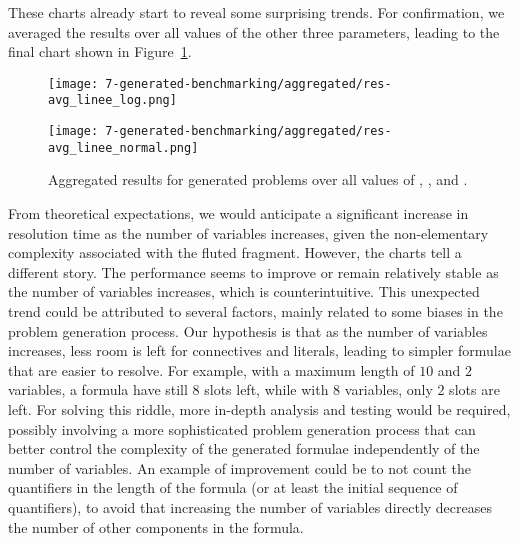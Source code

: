 These charts already start to reveal some surprising trends. For confirmation, we averaged the results over all values of the other three parameters, leading to the final chart shown in Figure~\ref{fig:agg-all-vars}.
\begin{figure}[H]
  \centering
  \begin{minipage}{1\textwidth}
    \centering
    \texttt{[image: 7-generated-benchmarking/aggregated/res-avg\_linee\_log.png]}
  \end{minipage}
  \hfill
  \begin{minipage}{1\textwidth}
    \centering
    \texttt{[image: 7-generated-benchmarking/aggregated/res-avg\_linee\_normal.png]}
  \end{minipage}
  \caption{Aggregated results for generated problems over all values of , , and .}\label{fig:agg-all-vars}
\end{figure}
From theoretical expectations, we would anticipate a significant increase in resolution time as the number of variables increases, given the non-elementary complexity associated with the fluted fragment.
However, the charts tell a different story. The performance seems to improve or remain relatively stable as the number of variables increases, which is counterintuitive.
This unexpected trend could be attributed to several factors, mainly related to some biases in the problem generation process.
Our hypothesis is that as the number of variables increases, less room is left for connectives and literals, leading to simpler formulae that are easier to resolve.
For example, with a maximum length of \(10\) and \(2\) variables, a formula have still \(8\) slots left, while with \(8\) variables, only \(2\) slots are left.
For solving this riddle, more in-depth analysis and testing would be required, possibly involving a more sophisticated problem generation process that can better control the complexity of the generated formulae independently of the number of variables.
An example of improvement could be to not count the quantifiers in the length of the formula (or at least the initial sequence of quantifiers), to avoid that increasing the number of variables directly decreases the number of other components in the formula.


